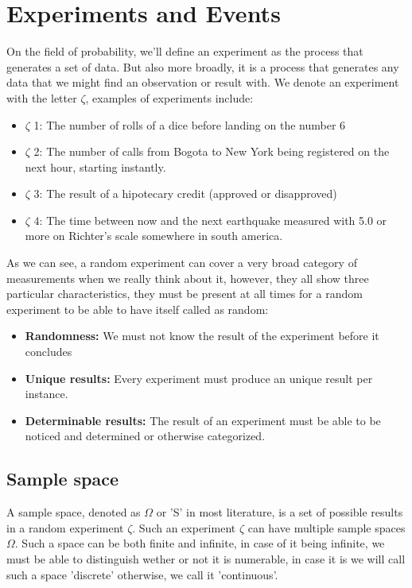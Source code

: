 \documentclass[11pt,fleqn]{book} %
\begin{document}
\section{Experiments and Events}

On the field of probability, we'll define an experiment as the process that generates a set
of data. But also more broadly, it is a process that generates any data that we might find
an observation or result with. We denote an experiment with the letter $ \zeta $, examples
of experiments include:

\begin{itemize}
    \item $\zeta$ 1: The number of rolls of a dice before landing on the number 6
    \item $\zeta$ 2: The number of calls from Bogota to New York being registered on the next hour, starting instantly.
    \item $\zeta$ 3: The result of a hipotecary credit (approved or disapproved)
    \item $\zeta$ 4: The time between now and the next earthquake measured with 5.0 or more on Richter's scale somewhere in south america.
\end{itemize}

As we can see, a random experiment can cover a very broad category of measurements when we really think about it, however,
they all show three particular characteristics, they must be present at all times for a random experiment to be able to 
have itself called as random:

\begin{itemize}
    \item \textbf{Randomness: }We must not know the result of the experiment before it concludes
    \item \textbf{Unique results: }Every experiment must produce an unique result per instance.
    \item \textbf{Determinable results: }The result of an experiment must be able to be noticed and determined or otherwise categorized.
\end{itemize}

\subsection{Sample space}

A sample space, denoted as $ \Omega  $ or 'S' in most literature, is a set of possible results in a random experiment 
$ \zeta $. Such an experiment $ \zeta $ can have multiple sample spaces $ \Omega $. Such a space can be both finite and infinite,
in case of it being infinite, we must be able to distinguish wether or not it is numerable, in case it is we will
call such a space 'discrete' otherwise, we call it 'continuous'.
\end{document}
